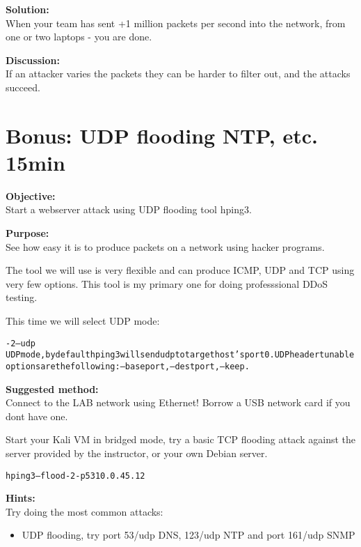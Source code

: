 \documentclass[a4paper,11pt,notitlepage]{report}
\begin{document}
{\bf Solution:}\\
When your team has sent +1 million packets per second into the network, from one or two laptops - you are done.

{\bf Discussion:}\\
If an attacker varies the packets they can be harder to filter out, and the attacks succeed.

\chapter{Bonus: UDP flooding NTP, etc. 15min}


{\bf Objective:}\\
Start a webserver attack using UDP flooding tool hping3.

{\bf Purpose:}\\
See how easy it is to produce packets on a network using hacker programs.

The tool we will use is very flexible and can produce ICMP, UDP and TCP using very few options. This tool is my primary one for doing professsional DDoS testing.

This time we will select UDP mode:

\begin{alltt}\footnotesize
-2 --udp
       UDP mode, by default hping3 will send udp to target host's port 0.  UDP header  tunable
       options are the following: --baseport, --destport, --keep.
\end{alltt}

{\bf Suggested method:}\\
Connect to the LAB network using Ethernet! Borrow a USB network card if you dont have one.

Start your Kali VM in bridged mode, try a basic TCP flooding attack against the server provided by the instructor, or your own Debian server.

\begin{alltt}\footnotesize
hping3 --flood -2 -p 53 10.0.45.12
\end{alltt}



{\bf Hints:}\\

Try doing the most common attacks:
\begin{itemize}
\item UDP flooding, try port 53/udp DNS, 123/udp NTP and port 161/udp SNMP
\end{itemize}
\end{document}
